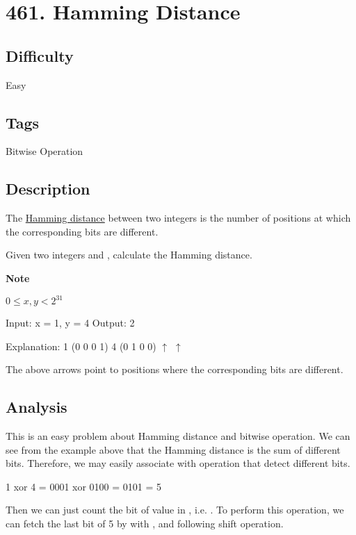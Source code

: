 \tocless\section{461. Hamming Distance}
\label{algo:461}

\subsection*{Difficulty}
Easy

\subsection*{Tags}
Bitwise Operation

\subsection*{Description}
The \href{https://en.wikipedia.org/wiki/Hamming_distance}{Hamming distance} between two integers is the number of positions at which the corresponding bits are different.

Given two integers  and , calculate the Hamming distance.

\textbf{Note}

$0 \le x, y < 2^{31}$

\begin{example}
\begin{multilinecode}
Input: x = 1, y = 4
Output: 2

Explanation:
1   (0 0 0 1)
4   (0 1 0 0)
       $\uparrow$    $\uparrow$

The above arrows point to positions where the corresponding bits are different.
\end{multilinecode}
\end{example}

\subsection*{Analysis}
This is an easy problem about Hamming distance and bitwise operation. We can see from the example above that the Hamming distance is the sum of different bits. Therefore, we may easily associate with  operation that detect different bits.

\begin{multilinecode}
1 xor 4 = 0001 xor 0100 = 0101 = 5
\end{multilinecode}
Then we can just count the bit of value  in , i.e. . To perform this operation, we can fetch the last bit of 5 by  with , and following shift operation.

